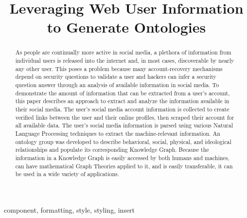 \documentclass[conference]{IEEEtran}
\begin{document}
\title{Leveraging Web User Information to Generate Ontologies
}

\author{
\and
{}
}

\maketitle

\begin{abstract}
As people are continually more active in social media, a plethora of information from individual users is released into the internet and, in most cases, discoverable by nearly any other user. This poses a problem because many account-recovery mechanisms depend on security questions to validate a user and hackers can infer a security question answer through an analysis of available information in social media. To demonstrate the amount of information that can be extracted from a user’s account, this paper describes an approach to extract and analyze the information available in their social media. The user’s social media account information is collected to create verified links between the user and their online profiles, then scraped their account for all available data. The user’s social media information is parsed using various Natural Language Processing techniques to extract the machine-relevant information. An ontology group was developed to describe behavioral, social, physical, and ideological relationships and populate its corresponding Knowledge Graph. Because the information in a Knowledge Graph is easily accessed by both humans and machines, can have mathematical Graph Theories applied to it, and is easily transferable, it can be used in a wide variety of applications. 
\end{abstract}

\begin{IEEEkeywords}
component, formatting, style, styling, insert
\end{IEEEkeywords}
\end{document}
